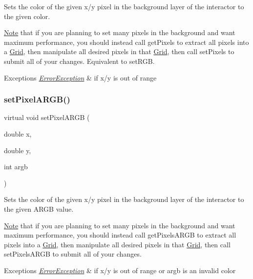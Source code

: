 Sets the color of the given x/y pixel in the background layer of the interactor to the given color. 

\mbox{\hyperlink{classNote}{Note}} that if you are planning to set many pixels in the background and want maximum performance, you should instead call get\+Pixels to extract all pixels into a \mbox{\hyperlink{classGrid}{Grid}}, then manipulate all desired pixels in that \mbox{\hyperlink{classGrid}{Grid}}, then call set\+Pixels to submit all of your changes. Equivalent to set\+R\+GB.


\begin{DoxyExceptions}{Exceptions}
{\em \mbox{\hyperlink{classErrorException}{Error\+Exception}}} & if x/y is out of range \\
\hline
\end{DoxyExceptions}
\mbox{\label{classGDrawingSurface_ab2f7c5a9462f552ad3f30d23c04605dd}} 
\subsubsection{\texorpdfstring{set\+Pixel\+A\+R\+G\+B()}{setPixelARGB()}\hspace{0.1cm}{\footnotesize\ttfamily [1/2]}}
{\footnotesize\ttfamily virtual void set\+Pixel\+A\+R\+GB (\begin{DoxyParamCaption}\item[{double}]{x,  }\item[{double}]{y,  }\item[{int}]{argb }\end{DoxyParamCaption})\hspace{0.3cm}{\ttfamily [pure virtual]}}



Sets the color of the given x/y pixel in the background layer of the interactor to the given A\+R\+GB value. 

\mbox{\hyperlink{classNote}{Note}} that if you are planning to set many pixels in the background and want maximum performance, you should instead call get\+Pixels\+A\+R\+GB to extract all pixels into a \mbox{\hyperlink{classGrid}{Grid}}, then manipulate all desired pixels in that \mbox{\hyperlink{classGrid}{Grid}}, then call set\+Pixels\+A\+R\+GB to submit all of your changes.


\begin{DoxyExceptions}{Exceptions}
{\em \mbox{\hyperlink{classErrorException}{Error\+Exception}}} & if x/y is out of range or argb is an invalid color \\
\hline
\end{DoxyExceptions}


